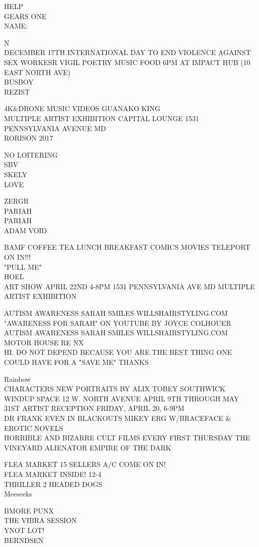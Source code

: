 \documentclass[10pt,letterpaper]{article}
\begin{document}
HELP\\
GEARS ONE\\
NAME:

N\\
DECEMBER 17TH INTERNATIONAL DAY TO END VIOLENCE AGAINST SEX WORKESR VIGIL POETRY MUSIC FOOD 6PM AT IMPACT HUB (10 EAST NORTH AVE)\\
BUSBOY\\
REZIST

4K\&DRONE MUSIC VIDEOS GUANAKO KING\\
MULTIPLE ARTIST EXHIBITION CAPITAL LOUNGE 1531 PENNSYLVANIA AVENUE MD\\
RORISON 2017

NO LOITERING\\
SBV\\
SKELY\\
LOVE

ZERGR\\
PARIAH\\
PARIAH\\
ADAM VOID

BAMF COFFEE TEA LUNCH BREAKFAST COMICS MOVIES TELEPORT ON IN!!!\\
"PULL ME"\\
HOEL\\
ART SHOW APRIL 22ND 4{-}8PM 1531 PENNSYLVANIA AVE MD MULTIPLE ARTIST EXHIBITION

AUTISM AWARENESS SARAH SMILES WILLSHAIRSTYLING.COM "AWARENESS FOR SARAH" ON YOUTUBE BY JOYCE COLHOUER\\
AUTISM AWARENESS SARAH SMILES WILLSHAIRSTYLING.COM\\
MOTOR HOUSE RE NX\\
HI.  DO NOT DEPEND BECAUSE YOU ARE THE BEST THING ONE COULD HAVE FOR A "SAVE ME" THANKS

Rainbow\\
CHARACTERS NEW PORTRAITS BY ALIX TOBEY SOUTHWICK WINDUP SPACE 12 W. NORTH AVENUE APRIL 9TH THROUGH MAY 31ST ARTIST RECEPTION FRIDAY, APRIL 20, 6{-}9PM\\
DR FRANK EVEN IN BLACKOUTS MIKEY ERG W/BRACEFACE \& EROTIC NOVELS\\
HORRIBLE AND BIZARRE CULT FILMS EVERY FIRST THURSDAY THE VINEYARD ALIENATOR EMPIRE OF THE DARK

FLEA MARKET 15 SELLERS A/C COME ON IN!\\
FLEA MARKET INSIDE! 12{-}4\\
THRILLER 2 HEADED DOGS\\
Meeseeks

BMORE PUNX\\
THE VIBRA SESSION\\
YNOT LOT!\\
BERNDSEN
\end{document}
